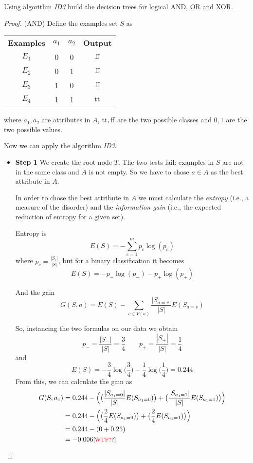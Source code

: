 \documentclass[12pt,a4paper,oneside]{book}
\begin{document}
\begin{exercise}
	Using algorithm \emph{ID3} build the decision trees for logical AND, OR and XOR.
	
	\begin{proof} (AND)
		Define the examples set $S$ as
		\begin{center}
			\begin{tabular}{ c c c c }
				\textbf{Examples} & \textbf{$a_1$} & \textbf{$a_2$} & \textbf{Output} \\
				$E_1$ & 0 & 0 & $\mathrm{ff}$ \\ 
				$E_2$ & 0 & 1 & $\mathrm{ff}$ \\  
				$E_3$ & 1 & 0 & $\mathrm{ff}$ \\
				$E_4$ & 1 & 1 & $\mathrm{tt}$
			\end{tabular}
		\end{center}
		where $a_1, a_2$ are attributes in $A$, $\mathrm{tt}, \mathrm{ff}$ are the two possible classes and $0, 1$ are the two possible values.
		
		Now we can apply the algorithm \emph{ID3}.
		\begin{itemize}
			\item \textbf{Step 1} We create the root node $T$. The two tests fail: examples in $S$ are not in the same class and $A$ is not empty. So we have to chose $a \in A$ as the best attribute in $A$.
			
			In order to chose the best attribute in $A$ we must calculate the \emph{entropy} (i.e., a measure of the disorder) and the \emph{information gain} (i.e., the expected reduction of entropy for a given set).
			
			Entropy is
			\[
			E(S) = - \sum_{c=1}^{m} p_c \log(p_c)
			\]
			where $p_c = \frac{|S_c|}{|S|}$, but for a binary classification it becomes
			\[
			E(S) = - p_- \log(p_-) - p_+ \log(p_+)
			\]
			
			And the gain
			\[
			G(S,a) = E(S) - \sum_{v\in V(a)} \frac{|S_{a=v}|}{|S|} E(S_{a=v})
			\]
			
			So, instancing the two formulas on our data we obtain
			\[
			p_- = \frac{|S_-|}{|S|} = \frac{3}{4} \qquad p_+ = \frac{|S_+|}{|S|} = \frac{1}{4}
			\]
			and
			\[
			E(S) = - \frac{3}{4} \log\big(\frac{3}{4}\big) - \frac{1}{4} \log\big(\frac{1}{4}\big) = 0.244
			\]
			From this, we can calculate the gain as
			\begin{equation*}
			\begin{split}
			G(S, a_1) &= 0.244 - \Big( \big(\frac{|S_{a_1=0}|}{|S|} E(S_{a_1=0})\big) + \big(\frac{|S_{a_1=1}|}{|S|} E(S_{a_1=1})\big) \Big) \\
			&= 0.244 - \Big( \big(\frac{2}{4} E(S_{a_1=0})\big) + \big(\frac{2}{4} E(S_{a_1=1})\big) \Big) \\
			&= 0.244 - (0 + 0.25) \\
			&= -0.006  \law{\color{red}{WTF??}}
			\end{split}
			\end{equation*}
			

\end{itemize}
\end{proof}
\end{exercise}
\end{document}
